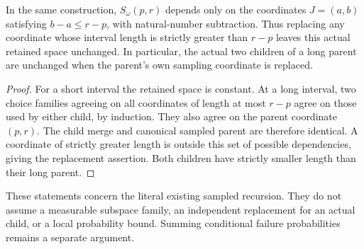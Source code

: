\begin{lemma}
    \label{lem:canonical_interval_sampling_tree_coordinate_dependence}
    \leanok
    In the same construction, $S_\omega(p,r)$ depends only on the
    coordinates $J=(a,b)$ satisfying $b-a\le r-p$, with natural-number
    subtraction. Thus replacing any coordinate whose interval length
    is strictly greater than $r-p$ leaves this actual retained space
    unchanged. In particular, the actual two children of a long parent
    are unchanged when the parent's own sampling coordinate is replaced.
\end{lemma}
\begin{proof}\leanok
    For a short interval the retained space is constant. At a long
    interval, two choice families agreeing on all coordinates of length
    at most $r-p$ agree on those used by either child, by induction.
    They also agree on the parent coordinate $(p,r)$. The child merge
    and canonical sampled parent are therefore identical. A coordinate
    of strictly greater length is outside this set of possible
    dependencies, giving the replacement assertion. Both children have
    strictly smaller length than their long parent.
\end{proof}

These statements concern the literal existing sampled recursion. They do
not assume a measurable subspace family, an independent replacement for
an actual child, or a local probability bound. Summing conditional failure
probabilities remains a separate argument.


